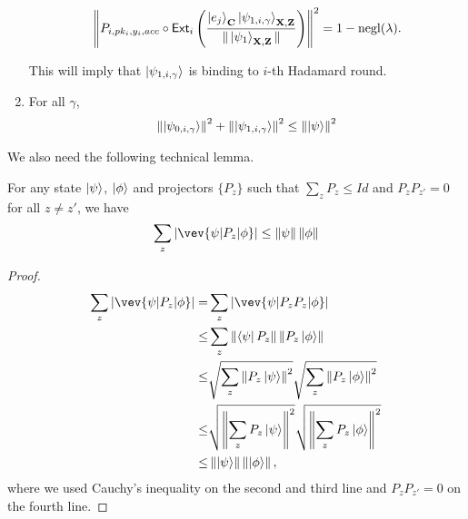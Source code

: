 \begin{lemma}
\begin{enumerate}
\begin{align}
     \left\lVert P_{i,pk_i,y_i,acc} \circ \mathsf{Ext}_i\left(\frac{\ket{e_j}_{\mathbf{C}}\ket{\psi_{1,i,\gamma}}_{\mathbf{X},\mathbf{Z}}}{\|\ket{\psi_1}_{\mathbf{X},\mathbf{Z}}\|}\right)\right\rVert^2 =1-\operatorname{negl}(\lambda).
\end{align}

This will imply that    $\ket{\psi_{1,i,\gamma}}$ is binding to $i$-th Hadamard round.

\item \label{property-partition-norm-sum}
  For all $\gamma$, 
  \begin{align}
    \left\lVert\ket{\psi_{0,i,\gamma}}\right\rVert^2+ \left\lVert\ket{\psi_{1,i,\gamma}}\right\rVert^2 \leq  \left\lVert\ket{\psi}\right\rVert^2 
\end{align}

  

 


\end{enumerate}
\end{lemma}








We also need the following technical lemma.
\begin{lemma}\label{lem:samp-tech}
For any state $\ket{\psi}$,  $\ket{\phi}$ and projectors $\{P_z\}$ such that $\sum_z P_z \leq Id$ and $P_z P_{z'} =0 $ for all $z\neq z'$, we have
$$  \sum_z |\vev{\psi|P_z|\phi}| \leq \norm{\psi}\norm{\phi} $$
\end{lemma}
\begin{proof}
\begin{align}
    \sum_z |\vev{\psi|P_z|\phi}| =&\sum_z|\vev{\psi|P_zP_z|\phi}| \nn \\
    \leq& \sum_z \norm{\bra{\psi}P_z} \norm{ P_z\ket{\phi}} \nn \\
    \leq&  \sqrt{\sum_z \norm{P_z\ket{\psi}}^2} \sqrt{\sum_z\norm{P_z\ket{\phi}}^2} \nn \\
    \leq& \sqrt{\norm{\sum_z P_z\ket{\psi}}^2 } \sqrt{\norm{\sum_z P_z\ket{\phi}}^2 } \nn \\
    \leq & \norm{\ket{\psi}}\norm{\ket{\phi}},
\end{align}
where we used Cauchy's inequality on the second and third line and $P_z P_{z'} =0 $ on the fourth line.
\end{proof}

